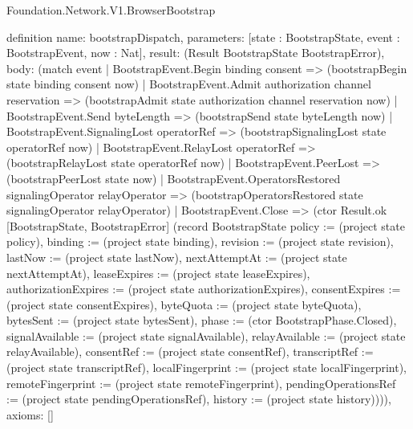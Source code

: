 \begin{lexlean}{Foundation.Network.V1.BrowserBootstrap}
\begin{semanticmodule}
definition{
  name: bootstrapDispatch,
  parameters: [state : BootstrapState, event : BootstrapEvent, now : Nat],
  result: (Result BootstrapState BootstrapError),
  body: (match event
    | BootstrapEvent.Begin binding consent => (bootstrapBegin state binding consent now)
    | BootstrapEvent.Admit authorization channel reservation => (bootstrapAdmit state authorization channel reservation now)
    | BootstrapEvent.Send byteLength => (bootstrapSend state byteLength now)
    | BootstrapEvent.SignalingLost operatorRef => (bootstrapSignalingLost state operatorRef now)
    | BootstrapEvent.RelayLost operatorRef => (bootstrapRelayLost state operatorRef now)
    | BootstrapEvent.PeerLost => (bootstrapPeerLost state now)
    | BootstrapEvent.OperatorsRestored signalingOperator relayOperator => (bootstrapOperatorsRestored state signalingOperator relayOperator)
    | BootstrapEvent.Close => (ctor Result.ok [BootstrapState, BootstrapError] (record BootstrapState {policy := (project state policy), binding := (project state binding), revision := (project state revision), lastNow := (project state lastNow), nextAttemptAt := (project state nextAttemptAt), leaseExpires := (project state leaseExpires), authorizationExpires := (project state authorizationExpires), consentExpires := (project state consentExpires), byteQuota := (project state byteQuota), bytesSent := (project state bytesSent), phase := (ctor BootstrapPhase.Closed), signalAvailable := (project state signalAvailable), relayAvailable := (project state relayAvailable), consentRef := (project state consentRef), transcriptRef := (project state transcriptRef), localFingerprint := (project state localFingerprint), remoteFingerprint := (project state remoteFingerprint), pendingOperationsRef := (project state pendingOperationsRef), history := (project state history)}))),
  axioms: []
}


\end{semanticmodule}
\end{lexlean}
